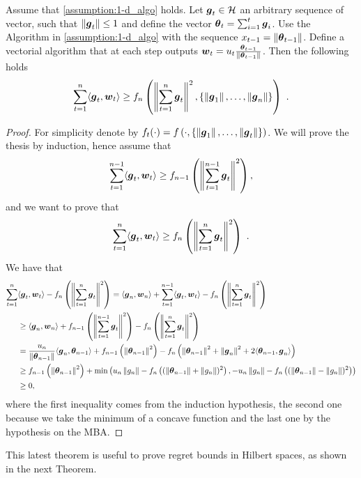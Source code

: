 \begin{theorem}
\label{theo:hilbert_reward}
  Assume that \ref{assumption:1-d_algo} holds.
  Let $\boldsymbol{g}_t \in \mathcal{H}$ an arbitrary sequence of vector, such that $\left\|{\boldsymbol{g}_t}\right\| \leq 1$ and define the vector ${\boldsymbol{\theta}}_t=\sum_{i=1}^{t} \boldsymbol{g}_i$.
  Use the Algorithm in \ref{assumption:1-d_algo} with the sequence $x_{t-1}= \left\|{{\boldsymbol{\theta}}_{t-1}}\right\|$.
  Define a vectorial algorithm that at each step outputs $\boldsymbol{w}_t = u_t \frac{{\boldsymbol{\theta}}_{t-1}}{\left\|{{\boldsymbol{\theta}}_{t-1}}\right\|}$. Then the following holds
  \[
  \sum_{t=1}^n \langle \boldsymbol{g}_t, \boldsymbol{w}_t \rangle \geq f_n\left( \left\|{\sum_{t=1}^n \boldsymbol{g}_t}\right\|^2, \left\{\left\|{\boldsymbol{g}_1}\right\|, \ldots, \left\|{\boldsymbol{g}_n}\right\|\right\}\right)~.
  \]
\end{theorem}
\begin{proof}
  For simplicity denote by $f_t(\cdot)=f\left(\cdot, \{\left\|{\boldsymbol{g}_1}\right\|, \ldots, \left\|{\boldsymbol{g}_t}\right\|\}\right)$.
  We will prove the thesis by induction, hence assume that 
  \[
  \sum_{t=1}^{n-1} \langle \boldsymbol{g}_t, \boldsymbol{w}_t \rangle \geq f_{n-1}\left( \left\|{\sum_{t=1}^{n-1} \boldsymbol{g}_t}\right\|^2\right),
  \]
  and we want to prove that 
  \[
  \sum_{t=1}^{n} \langle \boldsymbol{g}_t, \boldsymbol{w}_t \rangle \geq f_{n}\left( \left\|{\sum_{t=1}^{n} \boldsymbol{g}_t}\right\|^2\right)~.
  \]
  We have that
  \begin{align*}
  \sum_{t=1}^{n} &\langle \boldsymbol{g}_t, \boldsymbol{w}_t \rangle - f_n\left( \left\|{\sum_{t=1}^{n} \boldsymbol{g}_t}\right\|^2\right)
  = \langle \boldsymbol{g}_n, \boldsymbol{w}_n \rangle + \sum_{t=1}^{n-1} \langle \boldsymbol{g}_t, \boldsymbol{w}_t \rangle - f_n\left( \left\|{\sum_{t=1}^{n} \boldsymbol{g}_t}\right\|^2\right)\\
  &\geq \langle \boldsymbol{g}_n, \boldsymbol{w}_n \rangle + f_{n-1}\left( \left\|{\sum_{t=1}^{n-1} \boldsymbol{g}_t}\right\|^2\right) - f_n\left( \left\|{\sum_{t=1}^{n} \boldsymbol{g}_t}\right\|^2\right)\\
  &= \frac{u_n}{\left\|{{\boldsymbol{\theta}}_{n-1}}\right\|} \langle \boldsymbol{g}_n, {\boldsymbol{\theta}}_{n-1} \rangle + f_{n-1}\left( \left\|{{\boldsymbol{\theta}}_{n-1}}\right\|^2\right) - f_n\left( \left\|{{\boldsymbol{\theta}}_{n-1}}\right\|^2 + \left\|{\boldsymbol{g}_n}\right\|^2 + 2 \langle {\boldsymbol{\theta}}_{n-1}, \boldsymbol{g}_n \rangle \right)\\
  &\geq f_{n-1}\left( \left\|{{\boldsymbol{\theta}}_{n-1}}\right\|^2\right)+ \min\left(u_n \left\|{g_n}\right\|  - f_n\left( (\left\|{{\boldsymbol{\theta}}_{n-1}}\right\| + \left\|{g_n}\right\|)^2 \right), -u_n \left\|{g_n}\right\|  - f_n\left( (\left\|{{\boldsymbol{\theta}}_{n-1}}\right\| - \left\|{g_n}\right\|)^2 \right)\right)\\
  &\geq 0,
  \end{align*}
  where the first inequality comes from the induction hypothesis, the second one because we take the minimum of a concave function and the last one by the hypothesis on the \ac{MBA}.
\end{proof}
This latest theorem is useful to prove regret bounds in Hilbert spaces, as shown in the next Theorem.


